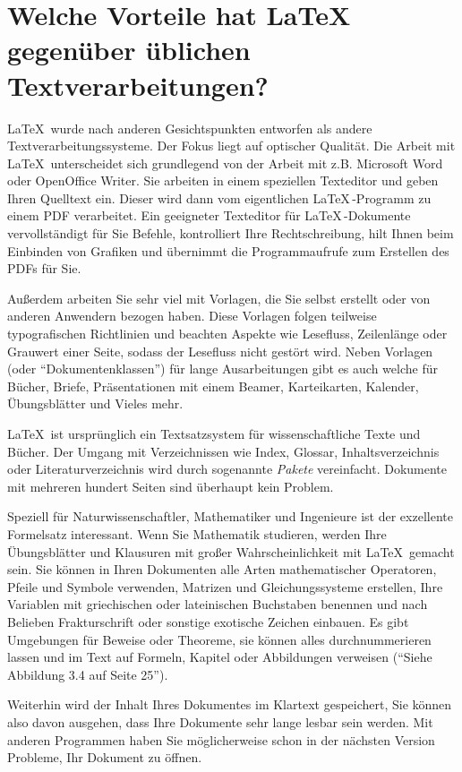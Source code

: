 \documentclass[a4paper,10pt]{scrartcl}
\begin{document}
\section*{Welche Vorteile hat \LaTeX \, gegenüber üblichen Textverarbeitungen?}
\LaTeX \, wurde nach anderen Gesichtspunkten entworfen als andere Textverarbeitungssysteme. Der Fokus liegt auf optischer Qualität. Die Arbeit mit \LaTeX \,  un\-terscheidet sich grundlegend von der Arbeit mit z.B. Microsoft Word \textregistered oder OpenOffice Writer. Sie arbeiten in einem speziellen Texteditor und geben Ihren Quelltext ein. Dieser wird dann vom eigentlichen \LaTeX \,-Programm zu einem PDF verarbeitet. Ein geeigneter Texteditor für \LaTeX \,-Dokumente vervollständigt für Sie Befehle, kontrolliert Ihre Rechtschreibung, hilt Ihnen beim Einbinden von Grafiken und übernimmt die Programmaufrufe zum Erstellen des PDFs für Sie.

Außerdem arbeiten Sie sehr viel mit Vorlagen, die Sie selbst erstellt oder von anderen Anwendern bezogen haben. Diese Vorlagen folgen teilweise typografischen Richtlinien und beachten Aspekte wie Lesefluss, Zeilenlänge oder Grauwert einer Seite, sodass der Lesefluss nicht gestört wird. Neben Vorlagen (oder "`Dokumentenklassen"') für lange Ausarbeitungen gibt es auch welche für Bücher, Briefe, Präsentationen mit einem Beamer, Karteikarten, Kalender, Übungsblätter und Vieles mehr.

\LaTeX \, ist ursprünglich ein Textsatzsystem für wissenschaftliche Texte und Bücher. Der Umgang mit Verzeichnissen wie Index, Glossar, Inhaltsverzeichnis oder Literaturverzeichnis wird durch sogenannte \emph{Pakete} vereinfacht. Dokumente mit mehreren hundert Seiten sind überhaupt kein Problem.

Speziell für Naturwissenschaftler, Mathematiker und Ingenieure ist der exzellente Formelsatz interessant. Wenn Sie Mathematik studieren, werden Ihre Übungsblätter und Klausuren mit großer Wahrscheinlichkeit mit \LaTeX \, gemacht sein. Sie können in Ihren Dokumenten alle Arten mathematischer Operatoren, Pfeile und Symbole verwenden, Matrizen und Gleichungssysteme erstellen, Ihre Variablen mit griechischen oder lateinischen Buchstaben benennen und nach Belieben Frakturschrift oder sonstige exotische Zeichen einbauen. Es gibt Umgebungen für Beweise oder Theoreme, sie können alles durchnummerieren lassen und im Text auf Formeln, Kapitel oder Abbildungen verweisen ("`Siehe Abbildung 3.4 auf Seite 25"').

Weiterhin wird der Inhalt Ihres Dokumentes im Klartext gespeichert, Sie können also davon ausgehen, dass Ihre Dokumente sehr lange lesbar sein werden. Mit anderen Programmen haben Sie möglicherweise schon in der nächsten Version Probleme, Ihr Dokument zu öffnen.
\end{document}
